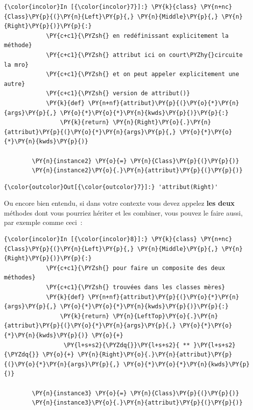    \begin{Verbatim}[commandchars=\\\{\}]
{\color{incolor}In [{\color{incolor}7}]:} \PY{k}{class} \PY{n+nc}{Class}\PY{p}{(}\PY{n}{Left}\PY{p}{,} \PY{n}{Middle}\PY{p}{,} \PY{n}{Right}\PY{p}{)}\PY{p}{:}
            \PY{c+c1}{\PYZsh{} en redéfinissant explicitement la méthode}
            \PY{c+c1}{\PYZsh{} attribut ici on court\PYZhy{}circuite la mro}
            \PY{c+c1}{\PYZsh{} et on peut appeler explicitement une autre}
            \PY{c+c1}{\PYZsh{} version de attribut()}
            \PY{k}{def} \PY{n+nf}{attribut}\PY{p}{(}\PY{o}{*}\PY{n}{args}\PY{p}{,} \PY{o}{*}\PY{o}{*}\PY{n}{kwds}\PY{p}{)}\PY{p}{:}
                \PY{k}{return} \PY{n}{Right}\PY{o}{.}\PY{n}{attribut}\PY{p}{(}\PY{o}{*}\PY{n}{args}\PY{p}{,} \PY{o}{*}\PY{o}{*}\PY{n}{kwds}\PY{p}{)}
            
        \PY{n}{instance2} \PY{o}{=} \PY{n}{Class}\PY{p}{(}\PY{p}{)}
        \PY{n}{instance2}\PY{o}{.}\PY{n}{attribut}\PY{p}{(}\PY{p}{)}
\end{Verbatim}


\begin{Verbatim}[commandchars=\\\{\}]
{\color{outcolor}Out[{\color{outcolor}7}]:} 'attribut(Right)'
\end{Verbatim}
            
    Ou encore bien entendu, si dans votre contexte vous devez appelez
\textbf{les deux} méthodes dont vous pourriez hériter et les combiner,
vous pouvez le faire aussi, par exemple comme ceci~:

    \begin{Verbatim}[commandchars=\\\{\}]
{\color{incolor}In [{\color{incolor}8}]:} \PY{k}{class} \PY{n+nc}{Class}\PY{p}{(}\PY{n}{Left}\PY{p}{,} \PY{n}{Middle}\PY{p}{,} \PY{n}{Right}\PY{p}{)}\PY{p}{:}
            \PY{c+c1}{\PYZsh{} pour faire un composite des deux méthodes}
            \PY{c+c1}{\PYZsh{} trouvées dans les classes mères}
            \PY{k}{def} \PY{n+nf}{attribut}\PY{p}{(}\PY{o}{*}\PY{n}{args}\PY{p}{,} \PY{o}{*}\PY{o}{*}\PY{n}{kwds}\PY{p}{)}\PY{p}{:}
                \PY{k}{return} \PY{n}{LeftTop}\PY{o}{.}\PY{n}{attribut}\PY{p}{(}\PY{o}{*}\PY{n}{args}\PY{p}{,} \PY{o}{*}\PY{o}{*}\PY{n}{kwds}\PY{p}{)} \PY{o}{+}
                 \PY{l+s+s2}{\PYZdq{}}\PY{l+s+s2}{ ** }\PY{l+s+s2}{\PYZdq{}} \PY{o}{+} \PY{n}{Right}\PY{o}{.}\PY{n}{attribut}\PY{p}{(}\PY{o}{*}\PY{n}{args}\PY{p}{,} \PY{o}{*}\PY{o}{*}\PY{n}{kwds}\PY{p}{)} 
            
        \PY{n}{instance3} \PY{o}{=} \PY{n}{Class}\PY{p}{(}\PY{p}{)}
        \PY{n}{instance3}\PY{o}{.}\PY{n}{attribut}\PY{p}{(}\PY{p}{)}
\end{Verbatim}


